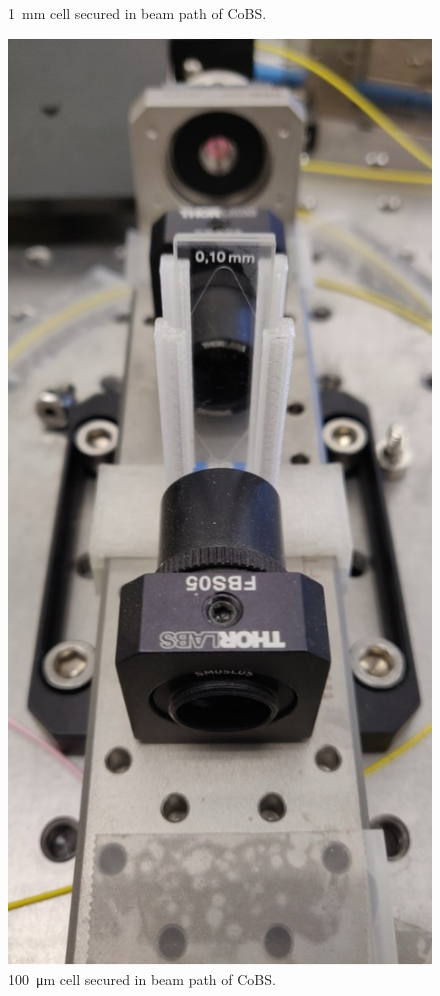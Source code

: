\begin{figure}[t]
  \caption{\SI{1}{\milli\meter}  cell secured in beam path of \acl{CoBS}.}
  \label{fig:Raman:1mmCS2}
\end{figure}

\begin{figure}[t]
  \centering
  \includegraphics[width=\textwidth]{figs/4-Raman/100umCS2.jpg}
  \caption{\SI{100}{\micro\meter}  cell secured in beam path of \acl{CoBS}.}
  \label{fig:Raman:100umCS2}
\end{figure}

